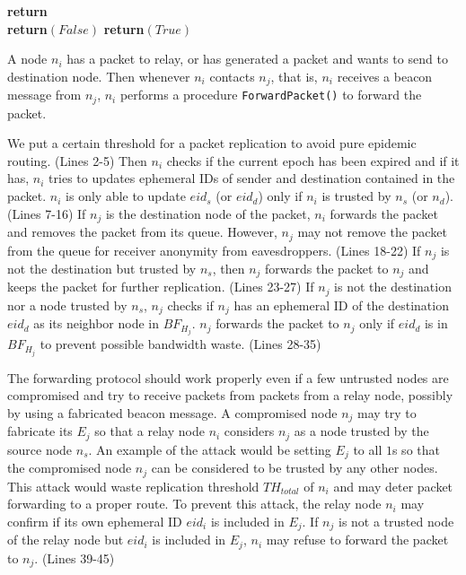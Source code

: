 \documentclass[11pt]{article}
\begin{document}
\begin{framed}
\begin{algorithmic}[1]
    \State \textbf{return}
  \EndProcedure	\\
  
	  \State \textbf{return}$(False)$
	\Else
	  \State \textbf{return}$(True)$
	\EndIf
  \EndProcedure

\end{algorithmic}

\end{framed}

A node $n_i$ has a packet to relay, or has generated a packet and wants to send to destination node.  Then whenever $n_i$ contacts $n_j$, that is, $n_i$ receives a beacon message from $n_j$, $n_i$ performs a procedure \texttt{ForwardPacket()} to forward the packet. 

We put a certain threshold for a packet replication to avoid pure epidemic routing. (Lines 2-5)
Then $n_i$ checks if the current epoch has been expired and if it has, $n_i$ tries to updates ephemeral IDs of sender and destination contained in the packet.  $n_i$ is only able to update $eid_s$ (or $eid_d$) only if $n_i$ is trusted by $n_s$ (or $n_d$). (Lines 7-16)
If $n_j$ is the destination node of the packet, $n_i$ forwards the packet and removes the packet from its queue.  However, $n_j$ may not remove the packet from the queue for receiver anonymity from eavesdroppers. (Lines 18-22)  If $n_j$ is not the destination but trusted by $n_s$, then $n_j$ forwards the packet to $n_j$ and keeps the packet for further replication. (Lines 23-27)  If $n_j$ is not the destination nor a node trusted by $n_s$, $n_j$ checks if $n_j$ has an ephemeral ID of the destination $eid_d$ as its neighbor node in $BF_{H_j}$.  $n_j$ forwards the packet to $n_j$ only if $eid_d$ is in $BF_{H_j}$ to prevent possible bandwidth waste. (Lines 28-35)


The forwarding protocol should work properly even if a few untrusted nodes are compromised and try to receive packets from packets from a relay node, possibly by using a fabricated beacon message. 
A compromised node $n_j$ may try to fabricate its $E_j$ so that a relay node $n_i$ considers $n_j$ as a node trusted by the source node $n_s$. 
An example of the attack would be setting $E_j$ to all $1$s so that the compromised node $n_j$ can be considered to be trusted by any other nodes. 
This attack would waste replication threshold $TH_{total}$ of $n_i$ and may deter packet forwarding to a proper route. 
To prevent this attack, the relay node $n_i$ may confirm if its own ephemeral ID $eid_i$ is included in $E_j$. 
If $n_j$ is not a trusted node of the relay node but $eid_i$ is included in $E_j$, $n_i$ may refuse to forward the packet to $n_j$. (Lines 39-45)
\end{document}
